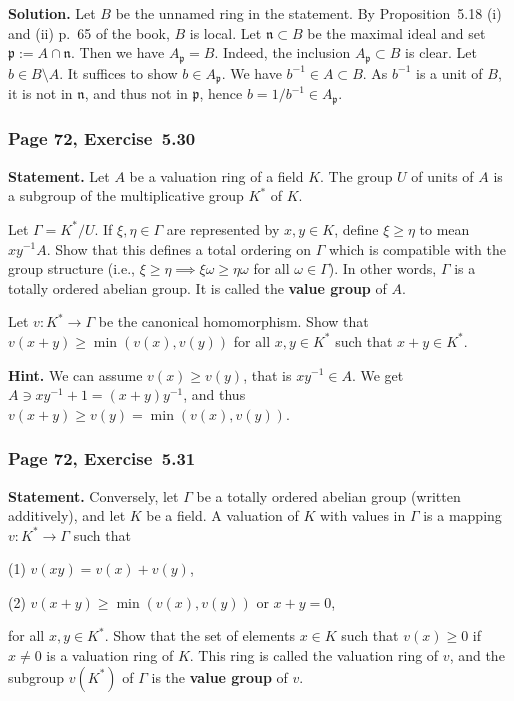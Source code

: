 \documentclass[12pt,letterpaper]{article}%
\newcommand{\mf}{\mathfrak}
\newcommand{\nnn}{\mf n}
\newcommand{\ppp}{\mf p}
\newcommand{\nn}{\noindent}
\begin{document}
\nn\textbf{Solution.} Let $B$ be the unnamed ring in the statement. By Proposition~5.18 (i) and (ii) p.~65 of the book, $B$ is local. Let $\nnn\subset B$ be the maximal ideal and set $\ppp:=A\cap\nnn$. Then we have $A_\ppp=B$. Indeed, the inclusion $A_\ppp\subset B$ is clear. Let $b\in B\setminus A$. It suffices to show $b\in A_\ppp$. We have $b^{-1}\in A\subset B$. As $b^{-1}$ is a unit of $B$, it is not in $\nnn$, and thus not in $\ppp$, hence $b=1/b^{-1}\in A_\ppp$.

\subsubsection{Page 72, Exercise~5.30}%

\textbf{Statement.} Let $A$ be a valuation ring of a field $K$. The group $U$ of units of $A$ is a subgroup of the multiplicative group $K^*$ of $K$.

Let $\Gamma=K^*/U$. If $\xi,\eta\in\Gamma$ are represented by $x,y\in K$, define $\xi\ge\eta$ to mean $xy^{-1} A$. Show that this defines a total ordering on $\Gamma$ which is compatible with the group structure (i.e., $\xi\ge\eta\implies\xi\omega\ge\eta\omega$ for all $\omega\in\Gamma$). In other words, $\Gamma$ is a totally ordered abelian group. It is called the \textbf{value group} of $A$.

Let $v:K^*\to\Gamma$ be the canonical homomorphism. Show that $v(x+y)\ge\min(v(x),v(y))$ for all $x,y\in K^*$ such that $x+y\in K^*$.

\nn\textbf{Hint.} We can assume $v(x)\ge v(y)$, that is $xy^{-1}\in A$. We get $A\ni xy^{-1}+1=(x+y)y^{-1}$, and thus $v(x+y)\ge v(y)=\min(v(x),v(y))$.

\subsubsection{Page 72, Exercise~5.31}\label{ex5.31}%

\textbf{Statement.} Conversely, let $\Gamma$ be a totally ordered abelian group (written additively), and let $K$ be a field. A valuation of $K$ with values in $\Gamma$ is a mapping $v:K^*\to\Gamma$ such that 

\nn(1) $v(xy)=v(x)+v(y)$,

\nn(2) $v(x+y)\ge\min(v(x),v(y))$ or $x+y=0$,

\nn for all $x,y\in K^*$. Show that the set of elements $x\in K$ such that $v(x)\ge0$ if $x\ne0$ is a valuation ring of $K$. This ring is called the valuation ring of $v$, and the subgroup $v(K^*)$ of $\Gamma$ is the \textbf{value group} of $v$.
\end{document}
